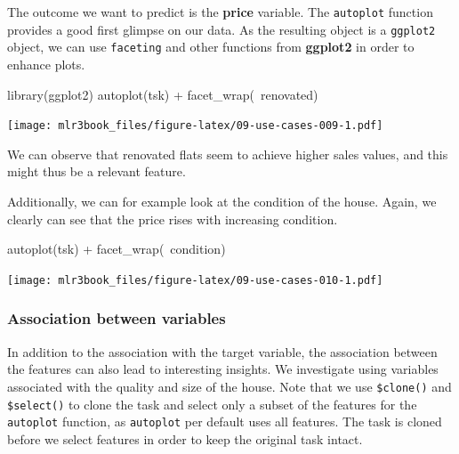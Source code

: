 \documentclass[12pt,]{scrbook}
\newenvironment{Shaded}{}{}
\newcommand{\KeywordTok}[1]{\textcolor[rgb]{0.00,0.00,1.00}{#1}}
\newcommand{\NormalTok}[1]{#1}
\newcommand{\OperatorTok}[1]{#1}
\newcommand{\StringTok}[1]{\textcolor[rgb]{0.00,0.50,0.50}{#1}}
\begin{document}
The outcome we want to predict is the \textbf{price} variable.
The \texttt{autoplot} function provides a good first glimpse on our data.
As the resulting object is a \texttt{ggplot2} object, we can use \texttt{faceting} and other functions from \textbf{ggplot2} in order to enhance plots.

\begin{Shaded}
\begin{Highlighting}[]
\KeywordTok{library}\NormalTok{(ggplot2)}
\KeywordTok{autoplot}\NormalTok{(tsk) }\OperatorTok{+}\StringTok{ }\KeywordTok{facet_wrap}\NormalTok{(}\OperatorTok{~}\NormalTok{renovated)}
\end{Highlighting}
\end{Shaded}

\texttt{[image: mlr3book\_files/figure-latex/09-use-cases-009-1.pdf]}

We can observe that renovated flats seem to achieve higher sales values, and this might thus be a relevant feature.

Additionally, we can for example look at the condition of the house.
Again, we clearly can see that the price rises with increasing condition.

\begin{Shaded}
\begin{Highlighting}[]
\KeywordTok{autoplot}\NormalTok{(tsk) }\OperatorTok{+}\StringTok{ }\KeywordTok{facet_wrap}\NormalTok{(}\OperatorTok{~}\NormalTok{condition)}
\end{Highlighting}
\end{Shaded}

\texttt{[image: mlr3book\_files/figure-latex/09-use-cases-010-1.pdf]}

\hypertarget{association-between-variables}{%
\subsubsection{Association between variables}\label{association-between-variables}}

In addition to the association with the target variable, the association between the features can also lead to interesting insights.
We investigate using variables associated with the quality and size of the house.
Note that we use \texttt{\$clone()} and \texttt{\$select()} to clone the task and select only a subset of the features for the \texttt{autoplot} function, as \texttt{autoplot} per default uses all features.
The task is cloned before we select features in order to keep the original task intact.
\end{document}
